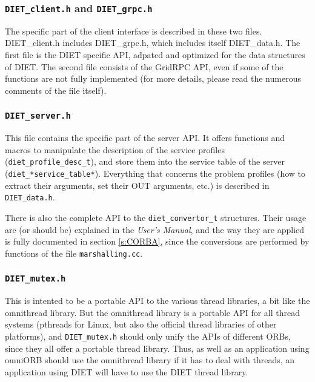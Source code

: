 \subsubsection{{\tt DIET\_client.h} and {\tt DIET\_grpc.h}}

The specific part of the client interface is described in these two files.
\textsf{DIET\_client.h} includes \textsf{DIET\_grpc.h}, which includes itself
\textsf{DIET\_data.h}.
The first file is the DIET specific API, adpated and optimized for the data
structures of DIET. The second file consists of the GridRPC API, even if some of
the functions are not fully implemented (for more details, please read the
numerous comments of the file itself).


\subsubsection{\tt DIET\_server.h}

This file contains the specific part of the server API.
It offers functions and macros to manipulate the description of the service
profiles (\verb+diet_profile_desc_t+), and store them into the service table of
the server (\verb+diet_*service_table*+). Everything that concerns the problem
profiles (how to extract their arguments, set their OUT arguments, etc.) is
described in \texttt{DIET\_data.h}.


There is also the complete API to the \texttt{diet\_convertor\_t} structures.
Their usage are (or should be) explained in the \textit{User's Manual}, and the
way they are applied is fully documented in section \ref{s:CORBA}, since the
conversions are performed by functions of the file \texttt{marshalling.cc}.

\subsubsection{\tt DIET\_mutex.h} 

This is intented to be a portable API to the various thread libraries, a bit
like the \textsf{omnithread} library. But the \textsf{omnithread} library is a
portable API for all thread systems (pthreads for Linux, but also the official
thread libraries of other platforms), and {\tt DIET\_mutex.h} should only unify
the APIs of different ORBs, since they all offer a portable thread library.
Thus, as well as an application using \textsf{omniORB} should use the
\textsf{omnithread} library if it has to deal with threads, an application using
DIET will have to use the DIET thread library.

